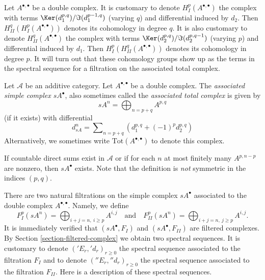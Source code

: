 \noindent
Let $A^{\bullet, \bullet}$ be a double complex. It is customary to denote
$H^p_I(A^{\bullet, \bullet})$
the complex with terms $\Ker(d_1^{p, q})/\Im(d_1^{p - 1, q})$
(varying $q$) and differential induced by $d_2$.
Then $H^q_{II}(H^p_I(A^{\bullet, \bullet}))$ denotes its cohomology in
degree $q$. It is also customary to denote $H^q_{II}(A^{\bullet, \bullet})$
the complex with terms $\Ker(d_2^{p, q})/\Im(d_2^{p, q - 1})$
(varying $p$) and differential induced by $d_1$.
Then $H^p_I(H^q_{II}(A^{\bullet, \bullet}))$ denotes its cohomology in
degree $p$. It will turn out that these cohomology groups show up
as the terms in the spectral sequence for a filtration on the
associated total complex.

\begin{definition}
\label{definition-associated-simple-complex}
Let $\mathcal{A}$ be an additive category.
Let $A^{\bullet, \bullet}$ be a double complex.
The {\it associated simple complex $sA^\bullet$}, also
sometimes called the {\it associated total complex} is
given by
$$
sA^n = \bigoplus\nolimits_{n = p + q} A^{p, q}
$$
(if it exists) with differential
$$
d_{sA}^n = \sum\nolimits_{n = p + q} (d_1^{p, q} + (-1)^p d_2^{p, q})
$$
Alternatively, we sometimes write $\text{Tot}(A^{\bullet, \bullet})$
to denote this complex.
\end{definition}

\noindent
If countable direct sums exist in $\mathcal{A}$ or if for each $n$ at most
finitely many $A^{p, n - p}$ are nonzero, then $sA^\bullet$ exists. Note that
the definition is {\it not} symmetric in the indices $(p, q)$.

\medskip\noindent
There are two natural filtrations on the simple complex $sA^\bullet$
associated to the double complex $A^{\bullet, \bullet}$. Namely, we
define
$$
F_I^p(sA^n) = \bigoplus\nolimits_{i + j = n, \ i \geq p} A^{i, j}
\quad
\text{and}
\quad
F_{II}^p(sA^n) = \bigoplus\nolimits_{i + j = n, \ j \geq p} A^{i, j}.
$$
It is immediately verified that $(sA^\bullet, F_I)$ and
$(sA^\bullet, F_{II})$ are filtered complexes.
By Section \ref{section-filtered-complex}
we obtain two spectral sequences. It is customary to
denote $({}'E_r, {}'d_r)_{r \geq 0}$ the spectral sequence associated
to the filtration $F_I$ and to denote $({}''E_r, {}''d_r)_{r \geq 0}$
the spectral sequence associated to the filtration $F_{II}$.
Here is a description of these spectral sequences.

